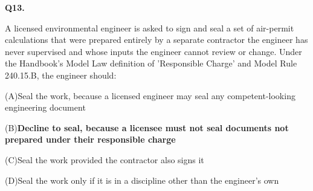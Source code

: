 \documentclass[11pt]{article}
\newcommand{\correct}[1]{\textbf{#1}\;{\color{accent}$\checkmark$}}
\newcommand{\optline}[2]{\par\noindent\hspace{1.2em}(#1)\hspace{0.6em}#2}
\begin{document}
\vspace{9pt}
\filbreak
\textbf{\color{accent}Q13.}\par\vspace{2pt}
A licensed environmental engineer is asked to sign and seal a set of air-permit calculations that were prepared entirely by a separate contractor the engineer has never supervised and whose inputs the engineer cannot review or change. Under the Handbook's Model Law definition of 'Responsible Charge' and Model Rule 240.15.B, the engineer should:\par\par\vspace{3pt}
\optline{A}{Seal the work, because a licensed engineer may seal any competent-looking engineering document}
\optline{B}{\correct{Decline to seal, because a licensee must not seal documents not prepared under their responsible charge}}
\optline{C}{Seal the work provided the contractor also signs it}
\optline{D}{Seal the work only if it is in a discipline other than the engineer's own}
\par\vspace{3pt}
\end{document}
